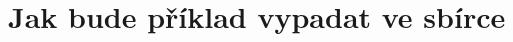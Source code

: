 \documentclass[12pt,a4paper,notitlepage,final]{article}
\begin{document}
\section{Jak bude příklad vypadat ve sbírce}

\end{document}
